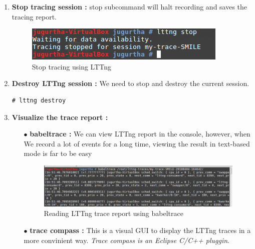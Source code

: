 \begin{enumerate}
	\item \textbf{Stop tracing session :} stop subcommand will halt recording and saves the tracing report.
		\begin{figure}[H]
			\centering
        	\includegraphics[scale=0.48]{img/solution/lttng-stop-session.png}
        	\caption{Stop tracing using LTTng}
        	\label{Stop tracing using LTTng}
    	\end{figure}
	
	\item \textbf{Destroy LTTng session :} We need to stop and destroy the current session.
			\begin{lstlisting}[style=BashInputStyle]
# lttng destroy
	\end{lstlisting}
	
		\item \textbf{Visualize the trace report : } 
		
			\begin{itemize}
				\item[$\bullet$] \textbf{babeltrace : } We can view LTTng report in the console, however, when We record a lot of events for a
long time, viewing the result in text-based mode is far to be easy
		\begin{figure}[H]
			\centering
        	\includegraphics[scale=0.40]{img/solution/babel-trace.png}
        	\caption{Reading LTTng trace report using babeltrace}
        	\label{Reading LTTng trace report using babeltrace}
    	\end{figure}				
				
				
				\item[$\bullet$] \textbf{trace compass : } This is a visual GUI to display the LTTng traces in a more convinient way. \emph{\color{orange}Trace compass is an Eclipse C/C++ pluggin}.
			\end{itemize}
\end{enumerate}




